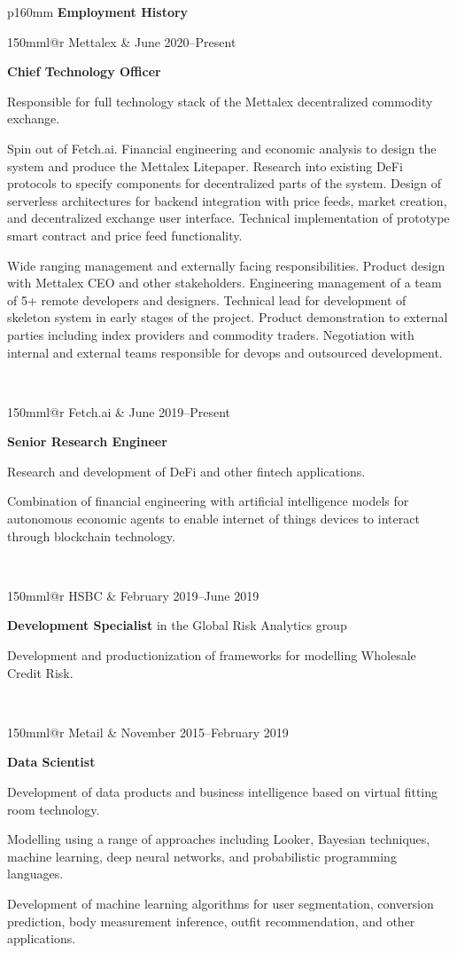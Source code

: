\documentclass[10pt,a4paper]{article}
\makeatletter
\newcommand{\role}[6]{
\begin{tabular*}{150mm}{l@{\extracolsep{\fill}}r}
#5 & #1--#2 \\ 
\multicolumn{2}{p{145mm}}
{\textbf{#3}#4

{\small #6}} 
\end{tabular*}
\vspace{2mm}
 }
\makeatother
\begin{document}
\begin{tabular}{p{160mm}}
  {\large \textbf{Employment History}}\\
  \hline
  \role{June 2020}{Present}{Chief Technology Officer}{}{Mettalex}
  {Responsible for full technology stack of the Mettalex decentralized commodity exchange.

  \footnotesize{Spin out of Fetch.ai.
  Financial engineering and economic analysis to design the system and produce the Mettalex Litepaper.  Research into existing DeFi
  protocols to specify components for decentralized parts of the system.
  Design of serverless architectures for backend integration with price feeds, market creation, and decentralized exchange
  user interface.  Technical implementation of prototype smart contract and price feed functionality.}

  \footnotesize{Wide ranging management and externally facing responsibilities.  Product design with Mettalex CEO
  and other stakeholders.  Engineering management of a team of 5+ remote developers and designers.
  Technical lead for development of skeleton
  system in early stages of the project.  Product demonstration to external parties including index providers and
  commodity traders.  Negotiation with internal and external teams responsible for devops and outsourced development.}
  }\\
  \role{June 2019}{Present}{Senior Research Engineer}{}{Fetch.ai}
  {Research and development of DeFi and other fintech applications.

   \footnotesize{Combination of financial engineering with artificial intelligence models for autonomous economic agents
   to enable internet of things devices to interact through blockchain technology.}
  }\\
  \role{February 2019}{June 2019}{Development Specialist}{ in the Global Risk Analytics group}{HSBC}
  {Development and productionization of frameworks for modelling Wholesale Credit Risk.
  }\\
  \role{November 2015}{February 2019}{Data Scientist}{}{Metail} 
  {Development of data products and business intelligence based on virtual fitting room technology.

   \footnotesize{Modelling using a range of approaches including Looker, Bayesian techniques,
   machine learning, deep neural networks, and probabilistic programming languages.

  Development of machine learning algorithms for user segmentation,
   conversion prediction, body measurement inference, outfit recommendation, and other applications.

}}
\end{tabular}
\end{document}
